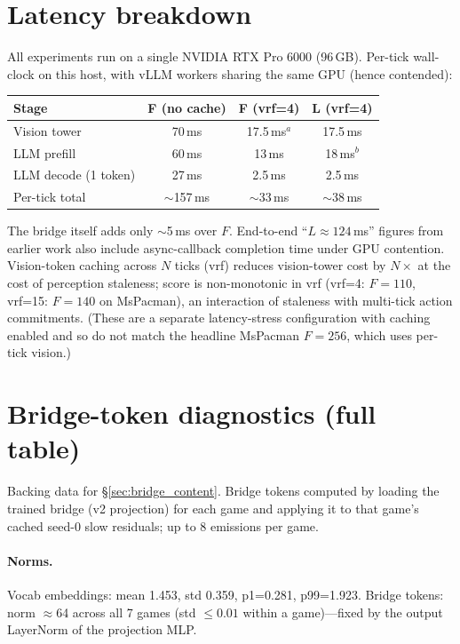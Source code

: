 \documentclass[11pt]{article}
\begin{document}
\section{Latency breakdown}
\label{app:latency}

All experiments run on a single NVIDIA RTX Pro 6000 (96\,GB). Per-tick wall-clock on this host, with vLLM workers sharing the same GPU (hence contended):
\smallskip

\begin{center}
\small
\begin{tabular}{lccc}
\toprule
Stage & F (no cache) & F (vrf=4) & L (vrf=4) \\
\midrule
Vision tower & 70\,ms & 17.5\,ms$^{a}$ & 17.5\,ms \\
LLM prefill  & 60\,ms & 13\,ms & 18\,ms$^{b}$ \\
LLM decode (1 token) & 27\,ms & 2.5\,ms & 2.5\,ms \\
\midrule
Per-tick total & $\sim$157\,ms & $\sim$33\,ms & $\sim$38\,ms \\
\bottomrule
\end{tabular}
\end{center}
\smallskip

The bridge itself adds only $\sim$5\,ms over $F$. End-to-end ``$L\!\approx\!124$\,ms'' figures from earlier work also include async-callback completion time under GPU contention. Vision-token caching across $N$ ticks (vrf) reduces vision-tower cost by $N\times$ at the cost of perception staleness; score is non-monotonic in vrf (vrf=4: $F\!=\!110$, vrf=15: $F\!=\!140$ on MsPacman), an interaction of staleness with multi-tick action commitments. (These are a separate latency-stress configuration with caching enabled and so do not match the headline MsPacman $F\!=\!256$, which uses per-tick vision.)

\section{Bridge-token diagnostics (full table)}
\label{app:bridge_diag}

Backing data for \S\ref{sec:bridge_content}. Bridge tokens computed by loading the trained bridge (v2 projection) for each game and applying it to that game's cached seed-0 slow residuals; up to 8 emissions per game.

\paragraph{Norms.} Vocab embeddings: mean 1.453, std 0.359, p1=0.281, p99=1.923. Bridge tokens: norm $\approx$64 across all 7 games (std $\le 0.01$ within a game)---fixed by the output LayerNorm of the projection MLP.
\end{document}
